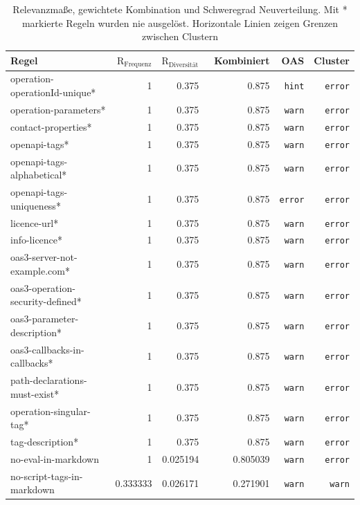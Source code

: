 \newpage
{\footnotesize
\begin{longtable}{lrrrrr}
  \caption{\normalsize Relevanzmaße, gewichtete Kombination und Schweregrad Neuverteilung. Mit * markierte Regeln wurden nie ausgelöst. Horizontale Linien zeigen Grenzen zwischen Clustern}
  \label{tab:combinedweighedprioritized}
  \endfirsthead
  \endhead
  \textbf{Regel} & \textbf{$\text{R}_\text{Frequenz}$} & \textbf{$\text{R}_\text{Diversität}$} & \ \textbf{Kombiniert} & \textbf{OAS} & \textbf{Cluster} \\ \hline \hline

  operation-operationId-unique* & 1 &  0.375 & 0.875 & \texttt{hint} & \texttt{error} \\ 
  operation-parameters* & 1 &  0.375 & 0.875 & \texttt{warn} & \texttt{error} \\ 
  contact-properties* & 1 &  0.375 & 0.875 & \texttt{warn} & \texttt{error} \\ 
  openapi-tags* & 1 &  0.375 & 0.875 & \texttt{warn} & \texttt{error} \\ 
  openapi-tags-alphabetical* &  1 &  0.375 & 0.875 & \texttt{warn} & \texttt{error} \\ 
  openapi-tags-uniqueness* &  1 &  0.375 & 0.875 & \texttt{error} & \texttt{error} \\ 
  licence-url* &  1 &  0.375 & 0.875 & \texttt{warn} & \texttt{error} \\ 
  info-licence* & 1 &  0.375 & 0.875 & \texttt{warn} & \texttt{error} \\ 
  oas3-server-not-example.com* &  1 &  0.375 & 0.875 & \texttt{warn} & \texttt{error} \\ 
  oas3-operation-security-defined* &  1 &  0.375 & 0.875 & \texttt{warn} & \texttt{error} \\ 
  oas3-parameter-description* & 1 & 0.375 & 0.875 & \texttt{warn} & \texttt{error} \\ 
  oas3-callbacks-in-callbacks* &  1 &  0.375 & 0.875 & \texttt{warn} & \texttt{error} \\ 
  path-declarations-must-exist* & 1 &  0.375 & 0.875 & \texttt{warn} & \texttt{error} \\ 
  operation-singular-tag* & 1 &  0.375 & 0.875 & \texttt{warn} & \texttt{error} \\ 
  tag-description* &  1 &  0.375 & 0.875 & \texttt{warn} & \texttt{error} \\ 
  no-eval-in-markdown &  1 &  0.025194 & 0.805039 & \texttt{warn} & \texttt{error} \\ \hline
  no-script-tags-in-markdown & 0.333333 &  0.026171 & 0.271901 & \texttt{warn} &  \texttt{warn} \\ 

\end{longtable}}
